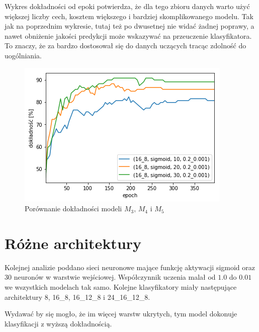 \documentclass{report}
\begin{document}
    Wykres dokładności od epoki potwierdza, że dla tego zbioru danych warto użyć większej liczby cech, kosztem większego i bardziej skomplikowanego modelu.
    Tak jak na poprzednim wykresie, tutaj też po dwusetnej nie widać żadnej poprawy, a nawet obniżenie jakości predykcji może wskazywać na przeuczenie klasyfikatora.
    To znaczy, że za bardzo dostosował się do danych uczących tracąc zdolność do uogólniania.

    \begin{figure}[htp]
        \centering
        \includegraphics[scale=0.8]{././img/feat-accuracy.png}
        \caption{Porównanie dokładności modeli $M_3$, $M_4$ i $M_5$}
    \end{figure}

    \section{Różne architektury}\label{sec:różneArchitektury}

    Kolejnej analizie poddano sieci neuronowe mające funkcję aktywacji sigmoid oraz 30 neuronów w warstwie wejściowej.
    Współczynnik uczenia malał od $1.0$ do $0.01$ we wszystkich modelach tak samo.
    Kolejne klasyfikatory miały następujące architektury 8, 16\_8, 16\_12\_8 i 24\_16\_12\_8.

    Wydawać by się mogło, że im więcej warstw ukrytych, tym model dokonuje klasyfikacji z wyższą dokładnością.
\end{document}
